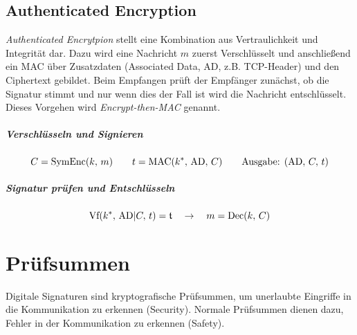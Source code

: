         \subsection{Authenticated Encryption}
            \textit{Authenticated Encrytpion} stellt eine Kombination aus Vertraulichkeit und Integrität dar. Dazu wird eine Nachricht \(m\) zuerst Verschlüsselt und anschließend ein MAC über Zusatzdaten (Associated Data, AD, z.B. TCP-Header) und den Ciphertext gebildet. Beim Empfangen prüft der Empfänger zunächst, ob die Signatur stimmt und nur wenn dies der Fall ist wird die Nachricht entschlüsselt. Dieses Vorgehen wird \textit{Encrypt-then-MAC} genannt.
            
            \subparagraph{Verschlüsseln und Signieren}
            \begin{equation*}
                C = \text{SymEnc}(k,\, m) \qquad t = \textrm{MAC}(k^*,\, \textrm{AD},\, C) \qquad \textrm{Ausgabe: } (\textrm{AD},\, C,\, t)
            \end{equation*}
            
            \subparagraph{Signatur prüfen und Entschlüsseln}
            \begin{equation*}
                \textrm{Vf}(k^*,\, \textrm{AD} \vert C,\, t) = \mathfrak{t} \quad\rightarrow\quad m = \textrm{Dec}(k,\, C)
            \end{equation*}

    \section{Prüfsummen}
        Digitale Signaturen sind kryptografische Prüfsummen, um unerlaubte Eingriffe in die Kommunikation zu erkennen (Security). Normale Prüfsummen dienen dazu, Fehler in der Kommunikation zu erkennen (Safety).

